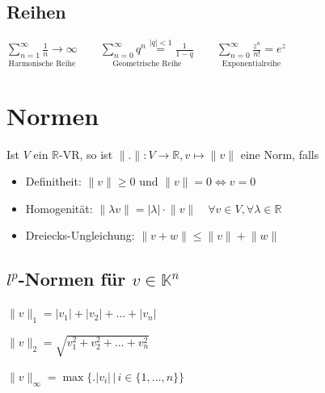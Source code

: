 \documentclass[6pt,a4paper]{scrartcl}
\newcommand{\iset}[2]{\ensuremath{\bigl\{ \bigl. #1 \, \bigr| \, #2 \bigr\}}}					%
\newcommand{\norm}[1]{\ensuremath{\|#1\|}}														%
\newcommand{\ra}[0]{\ensuremath{\rightarrow}} 									%
\begin{document}
\begin{multicols}{4}
\subsection{Reihen}

$\underset{\text{Harmonische Reihe}}{\sum\limits_{n=1}^\infty \frac{1}{n} \ra \infty} \qquad   \underset{\text{Geometrische Reihe}}{\sum\limits_{n=0}^\infty q^n \stackrel{|q|<1}= \frac{1}{1-q}}  \qquad \underset{\text{Exponentialreihe}}{\sum\limits_{n = 0}^{\infty} \frac{z^n}{n!} = e^z}$


\section{Normen}
Ist $V$ ein $\mathbb R$-VR, so ist $\| .\|: V \rightarrow \mathbb R, v \mapsto \|v\|$ eine Norm, falls
\begin{itemize}\itemsep0pt
	\item Definitheit: $\norm v \ge 0$ und $\norm v = 0 \Leftrightarrow v = 0$
	\item Homogenität: $\norm{\lambda v} = | \lambda | \cdot \norm v \quad \forall v \in V, \forall \lambda \in \mathbb R$
	\item Dreiecks-Ungleichung: $\norm{ v + w } \le \norm v + \norm w$	
\end{itemize}

	\subsection{$l^p$-Normen für $v \in \mathbb K^n$}
	\begin{description}\itemsep-1pt
		\item[$p=1$ Betragsnorm:]  $\|v\|_1 = |v_1| + |v_2| + \ldots + |v_n|$
		\item[$p=2$ Euklidische Norm:] $\|v\|_2 = \sqrt{ v_1^2 + v_2^2 + \ldots + v_n^2}$
		\item[$p\rightarrow \infty$ Maximumsnorm:] $\|v\|_\infty = \max \iset{|v_i|}{i \in \{1,\ldots,n\}}$
	\end{description}
	

\end{multicols}
\end{document}
